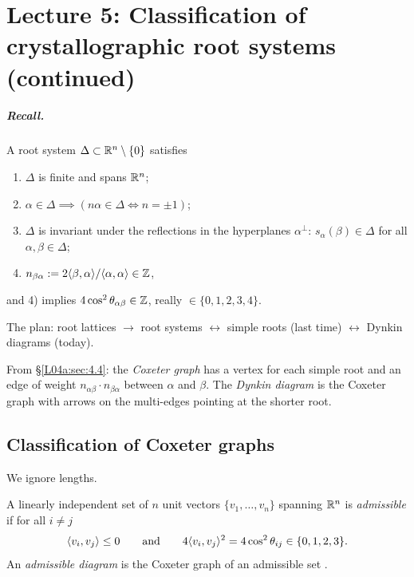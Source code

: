 
\chapter[Lecture 5: Root systems (continued)]{Lecture 5: Classification of crystallographic root systems (continued)}
\label{L04a:ch:L5}

\paragraph{Recall.} A root system $\Delta\subset\mathbb{R}^n\setminus\{0\}$ satisfies
\begin{enumerate}[label=\arabic*)]
\item $\Delta$ is finite and spans $\mathbb{R}^n$;
\item $\alpha\in\Delta\implies(n\alpha\in\Delta\iff n=\pm1)$;
\item $\Delta$ is invariant under the reflections in the hyperplanes $\alpha^\perp$:
  $s_\alpha(\beta)\in\Delta$ for all $\alpha,\beta\in\Delta$;
\item $n_{\beta\alpha}:=2\langle \beta, \alpha\rangle/\langle \alpha, \alpha\rangle\in\mathbb{Z}$,
\end{enumerate}
and 4) implies $4\cos^2\theta_{\alpha\beta}\in\mathbb{Z}$, really $\in\{0,1,2,3,4\}$.

The plan: root lattices $\to$ root systems $\longleftrightarrow$ simple roots (last time)
$\longleftrightarrow$ Dynkin diagrams (today).

From \S\ref{L04a:sec:4.4}: the \emph{Coxeter graph} has a vertex for each simple root and an edge of
weight $n_{\alpha\beta}\cdot n_{\beta\alpha}$ between $\alpha$ and $\beta$. The \emph{Dynkin diagram} is
the Coxeter graph with arrows on the multi-edges pointing at the shorter root.

\section{Classification of Coxeter graphs}
\label{L04a:sec:5.1}

We ignore lengths.

\begin{definition}\label{L04a:def:admissible}
A linearly independent set of $n$ unit vectors $\{v_1,\dots,v_n\}$ spanning $\mathbb{R}^n$ is \emph{admissible}
if for all $i\neq j$
\[
  \langle v_i, v_j\rangle\le0 \qquad\text{and}\qquad 4\langle v_i, v_j\rangle^2 = 4\cos^2\theta_{ij}\in\{0,1,2,3\}.
\]
An \emph{admissible diagram} is the Coxeter graph of an admissible set
.
\end{definition}

